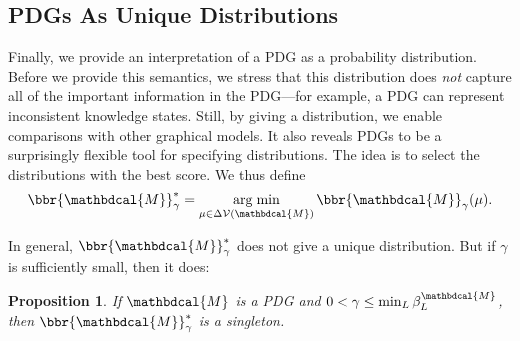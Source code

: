 \documentclass{article}
\theoremstyle{plain}
\newtheorem{prop}[theorem]{Proposition}
\theoremstyle{definition}
\theoremstyle{remark}
\DeclareMathOperator*{\argmin}{arg\;min}
\newcommand{\V}{\mathcal V}
\newcommand{\dg}[1]{\mathbdcal{#1}}
\numberwithin{equation}{section}
\begin{document}
    \subsection{PDGs As Unique Distributions}\label{sec:uniq-dist-semantics}

    Finally, we provide an interpretation of a PDG as a probability distribution.  
    Before we provide this semantics, we stress that
    this distribution does \emph{not} capture all of the important
    information in the PDG---for example, a PDG
    can represent inconsistent knowledge states. 
Still, by giving a distribution, we enable comparisons with other graphical models. 
It also 
reveals PDGs to be
a surprisingly flexible tool for specifying distributions. 
The idea is to select the distributions with the best score.
We thus define 
\begin{equation}
\bbr{\dg M}_\gamma^* = \argmin_{\mu \in
				   \Delta\V(\dg M)} \bbr{\dg M}_\gamma(\mu).
\end{equation}   

In general, $\bbr{\dg M}_\gamma^*$ does not give a unique
distribution.  But if $\gamma$ is sufficiently small, then it does:
\begin{prop}\label{prop:sem3}
If $\dg M$ is a PDG and $0 < \gamma \leq \min_L \beta_L^{\dg M}$, then $\bbr{\dg
M}_\gamma^*$ is a singleton. 
\end{prop}
\end{document}
